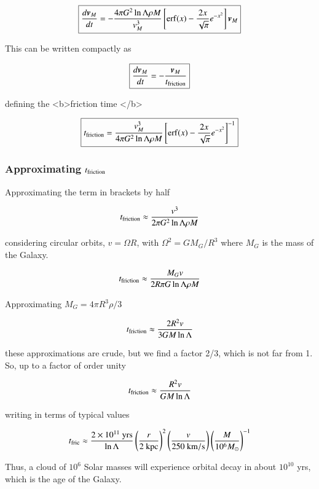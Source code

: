 \begin{equation}
\boxed{
\frac{d{\boldsymbol{v}}_M}{dt} = -\frac{4 \pi G^2 \ln\Lambda \rho M }{v_M^3} \left[\mathrm{erf}(x) - \frac{2x}{\sqrt{\pi}} e^{-x^2} \right]{\boldsymbol{v}}_M 
}
\end{equation}

This can be written compactly as 

\begin{equation}
\boxed{
\frac{d{\boldsymbol{v}}_M}{dt} = -\frac{{\boldsymbol{v}}_M}{t_{\rm friction}}
}
\end{equation}

defining the <b>friction time </b>

\begin{equation}
\boxed{
t_{\rm friction} = \frac{v_M^3}{4 \pi G^2 \ln\Lambda \rho M } \left[\mathrm{erf}(x) - \frac{2x}{\sqrt{\pi}} e^{-x^2} \right]^{-1}
}
\end{equation}


\subsubsection{Approximating $t_{\rm friction}$}

Approximating the term in brackets by half 

\begin{equation}
t_{\rm friction} \approx \frac{v^3}{2 \pi G^2 \ln\Lambda \rho M } 
\end{equation}


considering circular orbits, $v = \Omega R$, with $\Omega^2 = GM_G/R^3$ where $M_G$ is the mass of the Galaxy. 

\begin{equation}
t_{\rm friction} \approx \frac{M_G v}{2 R \pi G \ln\Lambda \rho M } 
\end{equation}


Approximating $M_G = 4\pi R^3 \rho/3$ 

\begin{equation}
t_{\rm friction} \approx \frac{2 R^2 v}{3 GM \ln\Lambda  } 
\end{equation}

these approximations are crude, but we find a factor 2/3, which is not far from 1. So, up to a factor of order unity

\begin{equation}
t_{\rm friction} \approx \frac{R^2 v}{GM \ln\Lambda } 
\end{equation}

writing in terms of typical values 

\begin{equation}
t_{\rm fric} \approx \frac{2 \times 10^{11} \ \mathrm{yrs}}{\ln\Lambda} \left(\frac{r}{2 \ \mathrm{kpc}}\right)^2 \left(\frac{v}{250 \ \mathrm{km/s}}\right) \left(\frac{M}{10^6 M_\odot}\right)^{-1}
\end{equation}

Thus, a cloud of $10^6$ Solar masses will experience orbital decay in about $10^{10}$ yrs, which is the age of the Galaxy.

